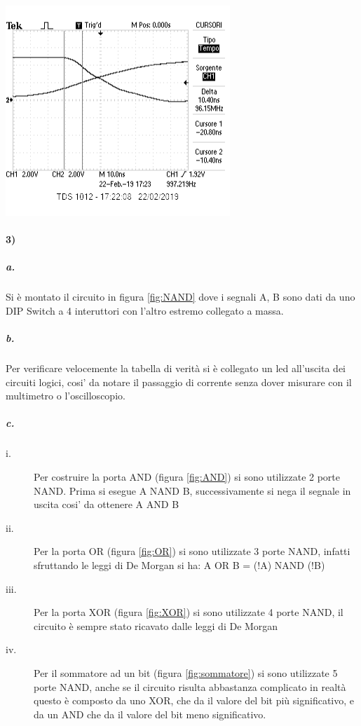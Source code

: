 \documentclass{article}
\begin{document}
	\begin{minipage}{.5\linewidth}
		\centering
		\includegraphics[width=\linewidth]{figure/TLH}
		\label{fig:TLH}
	\end{minipage}
	
\paragraph{3)}
	\subparagraph{a.}
	Si è montato il circuito in figura \ref{fig:NAND} dove i segnali A, B sono dati da uno DIP Switch a 4 interuttori con l'altro estremo collegato a massa.
	\subparagraph{b.}
	Per verificare velocemente la tabella di verità si è collegato un led all'uscita dei circuiti logici, cosi' da notare il passaggio di corrente senza dover misurare con il multimetro o l'oscilloscopio.
	
	\subparagraph{c.}
	\begin{description}
		\item[i.] Per costruire la porta AND (figura \ref{fig:AND}) si sono utilizzate 2 porte NAND. Prima si esegue A NAND B, successivamente si nega il segnale in uscita cosi' da ottenere A AND B
		\item[ii.] Per la porta OR (figura \ref{fig:OR}) si sono utilizzate 3 porte NAND, infatti sfruttando le leggi di De Morgan si ha: A OR B = (!A) NAND (!B) 
		\item[iii.] Per la porta XOR (figura \ref{fig:XOR}) si sono utilizzate 4 porte NAND,  il circuito è sempre stato ricavato dalle leggi di De Morgan
		\item[iv.] Per il sommatore ad un bit (figura \ref{fig:sommatore}) si sono utilizzate 5 porte NAND, anche se il circuito risulta abbastanza complicato in realtà questo è composto  da uno XOR, che da il valore del bit più significativo, e da un AND che da il valore del bit meno significativo.\newline
	\end{description}
\end{document}
